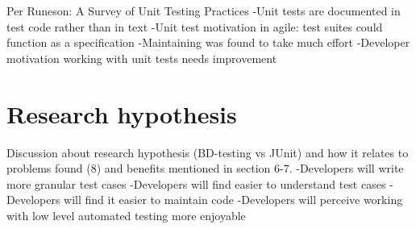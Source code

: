    Per Runeson: A Survey of Unit Testing Practices\newline
   -Unit tests are documented in test code rather than in text\newline
   -Unit test motivation in agile: test suites could function as a specification\newline
   -Maintaining was found to take much effort\newline
   -Developer motivation working with unit tests needs improvement\newline
\section{Research hypothesis} %
    Discussion about research hypothesis (BD-testing vs JUnit) and how it relates to problems found (8) and benefits mentioned in section 6-7.\newline
    -Developers will write more granular test cases\newline
    -Developers will find easier to understand test cases\newline
    -Developers will find it easier to maintain code\newline
    -Developers will perceive working with low level automated testing more enjoyable\newline
